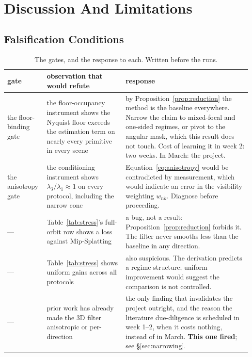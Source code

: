 \chapter{Discussion And Limitations}
\label{ch:discussion}

\section{Falsification Conditions}

\begin{table}[htbp]
  \centering
  \caption{The gates, and the response to each. Written before the runs.}
  \label{tab:gates}
  \small
  \begin{tabularx}{\linewidth}{L{0.62}L{1.10}L{1.28}}
    \toprule
    gate & observation that would refute & response \\
    \midrule
    the floor-binding gate & the floor-occupancy instrument shows the Nyquist floor exceeds the estimation term on nearly every primitive in every scene & by Proposition~\ref{prop:reduction} the method is the baseline everywhere. Narrow the claim to mixed-focal and one-sided regimes, or pivot to the angular mask, which this result does not touch. Cost of learning it in week 2: two weeks. In March: the project. \\
    the anisotropy gate & the conditioning instrument shows $\lambda_3/\lambda_1 \approx 1$ on every protocol, including the narrow cone & Equation~\eqref{eq:anisotropy} would be contradicted by measurement, which would indicate an error in the visibility weighting $w_{nk}$. Diagnose before proceeding. \\
    --- & Table~\ref{tab:stress}'s full-orbit row shows a loss against Mip-Splatting & a bug, not a result: Proposition~\ref{prop:reduction} forbids it. The filter never smooths less than the baseline in any direction. \\
    --- & Table~\ref{tab:stress} shows uniform gains across all protocols & also suspicious. The derivation predicts a regime structure; uniform improvement would suggest the comparison is not controlled. \\
    --- & prior work has already made the 3D filter anisotropic or per-direction & the only finding that invalidates the project outright, and the reason the literature due-diligence is scheduled in week 1--2, when it costs nothing, instead of in March. \textbf{This one fired}; see \S\ref{sec:narrowing}. \\
    \bottomrule
  \end{tabularx}
\end{table}

